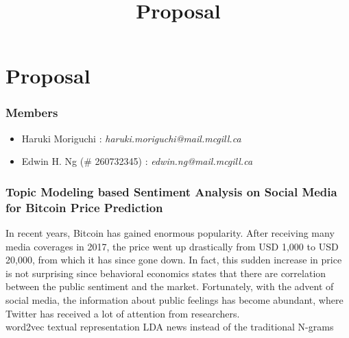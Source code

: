 \documentclass[12pt,a4paper]{report}
\begin{document}
\title{Proposal\\
}


\setcounter{page}{1}
\thispagestyle{empty} 


\chapter*{Proposal}
\subsection*{Members}
\begin{itemize}
\item Haruki Moriguchi : \textit{haruki.moriguchi@mail.mcgill.ca}
\item Edwin H. Ng (\# 260732345) : \textit{edwin.ng@mail.mcgill.ca}
\end{itemize}
\subsection*{Topic Modeling based Sentiment Analysis on Social Media for Bitcoin Price Prediction}
\par \qquad In recent years, Bitcoin has gained enormous popularity. After receiving many media coverages in 2017, the  price went up drastically from USD 1,000 to USD 20,000, from which it has since gone down. In fact, this sudden increase in price is not surprising since behavioral economics states that there are correlation between the public sentiment and the market. Fortunately, with the advent of social media, the information about public feelings has become abundant, where Twitter has received a lot of attention from researchers.
\\
 word2vec textual representation LDA news instead of the traditional N-grams
\end{document}
